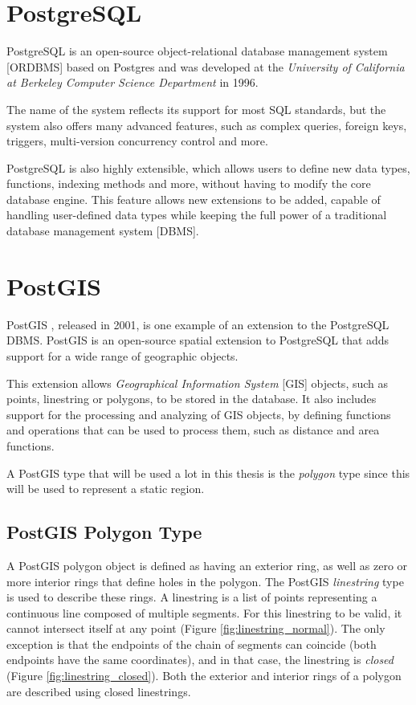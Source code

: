
\section{PostgreSQL}
\label{section:postgresql}

PostgreSQL \cite{postgresql} is an open-source object-relational database management system [ORDBMS] based on Postgres and was developed at the \textit{University of California at  Berkeley Computer Science Department} in 1996.

The name of the system reflects its support for most SQL standards, but the system also offers many advanced features, such as complex queries, foreign keys, triggers, multi-version concurrency control and more. 

PostgreSQL is also highly extensible, which allows users to define new data types, functions, indexing methods and more, without having to modify the core database engine. This feature allows new extensions to be added, capable of handling user-defined data types while keeping the full power of a traditional database management system [DBMS].

\section{PostGIS}
\label{section:postgis}

PostGIS \cite{postgis}, released in 2001, is one example of an extension to the PostgreSQL DBMS. PostGIS is an open-source spatial extension to PostgreSQL that adds support for a wide range of geographic objects. 

This extension allows \textit{Geographical Information System} [GIS] objects, such as points, linestring or polygons, to be stored in the database. It also includes support for the processing and analyzing of GIS objects, by defining functions and operations that can be used to process them, such as distance and area functions.

A PostGIS type that will be used a lot in this thesis is the \textit{polygon} type since this will be used to represent a static region. 

\subsection{PostGIS Polygon Type}
\label{section:postgis_polygon}

A PostGIS polygon object is defined as having an exterior ring, as well as zero or more interior rings that define holes in the polygon. The PostGIS \textit{linestring} type is used to describe these rings. A linestring
is a list of points representing a continuous line composed of multiple segments. For this linestring to be valid, it cannot intersect itself at any point (Figure \ref{fig:linestring_normal}). The only exception is that the endpoints of the chain of segments can coincide (both endpoints have the same coordinates), and in that case, the linestring is \textit{closed} (Figure \ref{fig:linestring_closed}). Both the exterior and interior rings of a polygon are described using closed linestrings.

